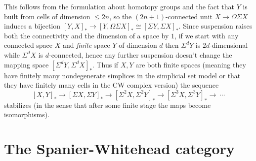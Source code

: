 This follows from the formulation about homotopy groups and the fact that \(Y\) is built from cells of dimension \(\leq 2n\), so the \((2n+1)\)-connected unit \(X \to \Omega \Sigma X\) induces a bijection \([Y, X]_* \to [Y, \Omega \Sigma X]_* \cong [\Sigma Y, \Sigma X]_*\). Since suspension raises both the connectivity and the dimension of a space by \(1\), if we start with any connected space \(X\) and \emph{finite} space \(Y\) of dimension \(d\) then \(\Sigma^d Y\) is \(2d\)-dimensional while \(\Sigma^d X\) is \(d\)-connected, hence any further suspension doesn't change the mapping space \([\Sigma^d Y, \Sigma^d X]_*\). Thus if \(X, Y\) are both finite spaces (meaning they have finitely many nondegenerate simplices in the simplicial set model or that they have finitely many cells in the CW complex version) the sequence \[[X, Y]_* \to [\Sigma X, \Sigma Y]_* \to [\Sigma^2 X, \Sigma^2 Y]_* \to [\Sigma^3 X, \Sigma^3 Y]_* \to\ \cdots\]stabilizes (in the sense that after some finite stage the maps become isomorphisms).

\section{The Spanier-Whitehead category}

